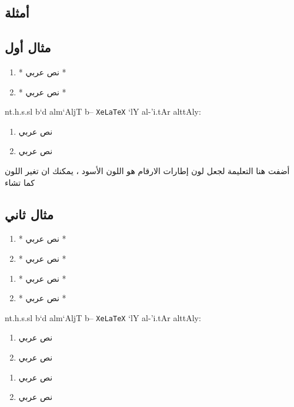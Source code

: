 \documentclass[8pt,a4paper]{article}
\begin{document}
\subsection*{أمثلة}
\subsection*{مثال أول}
\begin{arab}
\begin{boxlis}
\begin{enumerate}
\item *\textarabic{\bantii
نص عربي }*
\item *\textarabic{\bantii
نص عربي }*
\end{enumerate}
\end{boxlis}
nt.h.s.sl b`d alm`AljT b-- \texttt{XeLaTeX}
`lY al-'i.tAr alttAly:
\end{arab}
\begin{enumerate}
\item 
نص عربي 
\item 
نص عربي
\end{enumerate}
أضفت هنا التعليمة 
لجعل لون إطارات الارقام هو اللون الأسود ، يمكنك ان تغير اللون كما تشاء
\subsection*{مثال ثاني}
\begin{arab}
\begin{boxlis}
\begin{enumerate}
\item *\textarabic{\bantii
نص عربي }*
\item *\textarabic{\bantii
نص عربي }*
\end{enumerate}
\begin{enumerate}
\item *\textarabic{\bantii
نص عربي }*
\item *\textarabic{\bantii
نص عربي }*
\end{enumerate}
\end{boxlis}
nt.h.s.sl b`d alm`AljT b-- \texttt{XeLaTeX}
`lY al-'i.tAr alttAly:
\end{arab}
\begin{enumerate}
\item 
نص عربي 
\item 
نص عربي
\end{enumerate}
\begin{enumerate}
\item 
نص عربي 
\item 
نص عربي 
\end{enumerate}
\end{document}
